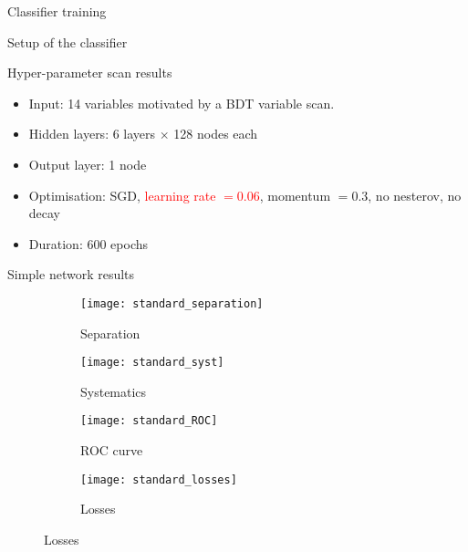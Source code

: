 \begin{frame}[c]
\begin{center}
\Huge Classifier training
\end{center}
\end{frame}

\begin{frame}{Setup of the classifier}
\begin{block}{Hyper-parameter scan results}
\begin{itemize}
\item Input: \num{14} variables motivated by a BDT variable scan.
\item Hidden layers: \num{6} \ELU layers $\times$ \num{128} nodes each
\item Output layer: \num{1} \SIGMOID node
\item Optimisation: SGD, \textcolor{red}{learning rate $=0.06$}, momentum $=0.3$, no nesterov, no decay
\item Duration: 600 epochs
\end{itemize}
\end{block}
\end{frame}

\begin{frame}{Simple network results}
\vspace{-2mm}
\begin{figure}[htbp]
    \centering
    \begin{subfigure}[b]{0.4\textwidth}
        \texttt{[image: standard\_separation]}
        \caption{Separation}
        \label{fig:simple:final:sepa}
    \end{subfigure}
\quad
    \begin{subfigure}[b]{0.4\textwidth}
        \texttt{[image: standard\_syst]}
        \caption{Systematics}
        \label{fig:simple:final:syst}
    \end{subfigure}

    \begin{subfigure}[b]{0.4\textwidth}
		\texttt{[image: standard\_ROC]}
		\caption{ROC curve}
		\label{fig:simple:final:roc}
	\end{subfigure}
\quad
	\begin{subfigure}[b]{0.4\textwidth}
		\texttt{[image: standard\_losses]}
		\caption{Losses}
		\label{fig:simple:final:loss}
	\end{subfigure}
\end{figure}
\end{frame}